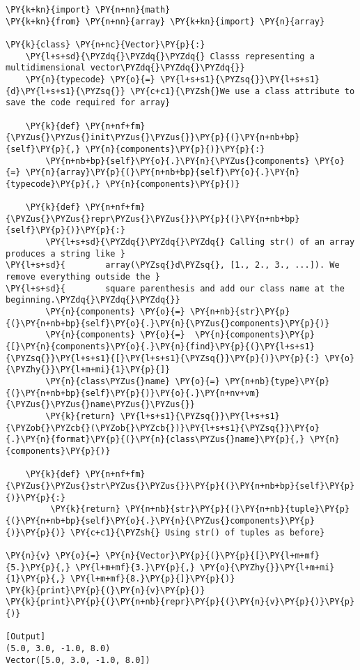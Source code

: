 \begin{Verbatim}[label=\makebox{\url{https://bitbucket.org/lbaldini/programming/src/tip/snippets/vector.py}},commandchars=\\\{\}]
\PY{k+kn}{import} \PY{n+nn}{math}
\PY{k+kn}{from} \PY{n+nn}{array} \PY{k+kn}{import} \PY{n}{array}

\PY{k}{class} \PY{n+nc}{Vector}\PY{p}{:}
    \PY{l+s+sd}{\PYZdq{}\PYZdq{}\PYZdq{} Classs representing a multidimensional vector\PYZdq{}\PYZdq{}\PYZdq{}}    
    \PY{n}{typecode} \PY{o}{=} \PY{l+s+s1}{\PYZsq{}}\PY{l+s+s1}{d}\PY{l+s+s1}{\PYZsq{}} \PY{c+c1}{\PYZsh{}We use a class attribute to save the code required for array}
    
    \PY{k}{def} \PY{n+nf+fm}{\PYZus{}\PYZus{}init\PYZus{}\PYZus{}}\PY{p}{(}\PY{n+nb+bp}{self}\PY{p}{,} \PY{n}{components}\PY{p}{)}\PY{p}{:}
        \PY{n+nb+bp}{self}\PY{o}{.}\PY{n}{\PYZus{}components} \PY{o}{=} \PY{n}{array}\PY{p}{(}\PY{n+nb+bp}{self}\PY{o}{.}\PY{n}{typecode}\PY{p}{,} \PY{n}{components}\PY{p}{)}
        
    \PY{k}{def} \PY{n+nf+fm}{\PYZus{}\PYZus{}repr\PYZus{}\PYZus{}}\PY{p}{(}\PY{n+nb+bp}{self}\PY{p}{)}\PY{p}{:}
        \PY{l+s+sd}{\PYZdq{}\PYZdq{}\PYZdq{} Calling str() of an array produces a string like }
\PY{l+s+sd}{        array(\PYZsq{}d\PYZsq{}, [1., 2., 3., ...]). We remove everything outside the }
\PY{l+s+sd}{        square parenthesis and add our class name at the beginning.\PYZdq{}\PYZdq{}\PYZdq{}}
        \PY{n}{components} \PY{o}{=} \PY{n+nb}{str}\PY{p}{(}\PY{n+nb+bp}{self}\PY{o}{.}\PY{n}{\PYZus{}components}\PY{p}{)}
        \PY{n}{components} \PY{o}{=}  \PY{n}{components}\PY{p}{[}\PY{n}{components}\PY{o}{.}\PY{n}{find}\PY{p}{(}\PY{l+s+s1}{\PYZsq{}}\PY{l+s+s1}{[}\PY{l+s+s1}{\PYZsq{}}\PY{p}{)}\PY{p}{:} \PY{o}{\PYZhy{}}\PY{l+m+mi}{1}\PY{p}{]}
        \PY{n}{class\PYZus{}name} \PY{o}{=} \PY{n+nb}{type}\PY{p}{(}\PY{n+nb+bp}{self}\PY{p}{)}\PY{o}{.}\PY{n+nv+vm}{\PYZus{}\PYZus{}name\PYZus{}\PYZus{}}
        \PY{k}{return} \PY{l+s+s1}{\PYZsq{}}\PY{l+s+s1}{\PYZob{}\PYZcb{}(\PYZob{}\PYZcb{})}\PY{l+s+s1}{\PYZsq{}}\PY{o}{.}\PY{n}{format}\PY{p}{(}\PY{n}{class\PYZus{}name}\PY{p}{,} \PY{n}{components}\PY{p}{)}

    \PY{k}{def} \PY{n+nf+fm}{\PYZus{}\PYZus{}str\PYZus{}\PYZus{}}\PY{p}{(}\PY{n+nb+bp}{self}\PY{p}{)}\PY{p}{:}
         \PY{k}{return} \PY{n+nb}{str}\PY{p}{(}\PY{n+nb}{tuple}\PY{p}{(}\PY{n+nb+bp}{self}\PY{o}{.}\PY{n}{\PYZus{}components}\PY{p}{)}\PY{p}{)} \PY{c+c1}{\PYZsh{} Using str() of tuples as before}
        
\PY{n}{v} \PY{o}{=} \PY{n}{Vector}\PY{p}{(}\PY{p}{[}\PY{l+m+mf}{5.}\PY{p}{,} \PY{l+m+mf}{3.}\PY{p}{,} \PY{o}{\PYZhy{}}\PY{l+m+mi}{1}\PY{p}{,} \PY{l+m+mf}{8.}\PY{p}{]}\PY{p}{)}
\PY{k}{print}\PY{p}{(}\PY{n}{v}\PY{p}{)}
\PY{k}{print}\PY{p}{(}\PY{n+nb}{repr}\PY{p}{(}\PY{n}{v}\PY{p}{)}\PY{p}{)}

[Output]
(5.0, 3.0, -1.0, 8.0)
Vector([5.0, 3.0, -1.0, 8.0])
\end{Verbatim}